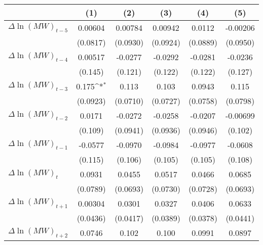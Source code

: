 {
\def\sym#1{\ifmmode^{#1}\else\(^{#1}\)\fi}
\begin{tabular}{l*{5}{c}}
\hline\hline
          &\multicolumn{1}{c}{(1)}         &\multicolumn{1}{c}{(2)}         &\multicolumn{1}{c}{(3)}         &\multicolumn{1}{c}{(4)}         &\multicolumn{1}{c}{(5)}         \\
\hline
$\Delta \ln(MW)_{t-5}$&  0.00604         &  0.00784         &  0.00942         &   0.0112         & -0.00206         \\
          & (0.0817)         & (0.0930)         & (0.0924)         & (0.0889)         & (0.0950)         \\
[1em]
$\Delta \ln(MW)_{t-4}$&  0.00517         &  -0.0277         &  -0.0292         &  -0.0281         &  -0.0236         \\
          &  (0.145)         &  (0.121)         &  (0.122)         &  (0.122)         &  (0.127)         \\
[1em]
$\Delta \ln(MW)_{t-3}$&    0.175\sym{*}  &    0.113         &    0.103         &   0.0943         &    0.115         \\
          & (0.0923)         & (0.0710)         & (0.0727)         & (0.0758)         & (0.0798)         \\
[1em]
$\Delta \ln(MW)_{t-2}$&   0.0171         &  -0.0272         &  -0.0258         &  -0.0207         & -0.00699         \\
          &  (0.109)         & (0.0941)         & (0.0936)         & (0.0946)         &  (0.102)         \\
[1em]
$\Delta \ln(MW)_{t-1}$&  -0.0577         &  -0.0970         &  -0.0984         &  -0.0977         &  -0.0608         \\
          &  (0.115)         &  (0.106)         &  (0.105)         &  (0.105)         &  (0.108)         \\
[1em]
$\Delta \ln(MW)_{t}$&   0.0931         &   0.0455         &   0.0517         &   0.0466         &   0.0685         \\
          & (0.0789)         & (0.0693)         & (0.0730)         & (0.0728)         & (0.0693)         \\
[1em]
$\Delta \ln(MW)_{t+1}$&  0.00304         &   0.0301         &   0.0327         &   0.0406         &   0.0633         \\
          & (0.0436)         & (0.0417)         & (0.0389)         & (0.0378)         & (0.0441)         \\
[1em]
$\Delta \ln(MW)_{t+2}$&   0.0746         &    0.102         &    0.100         &   0.0991         &   0.0897         \\

\end{tabular}}
